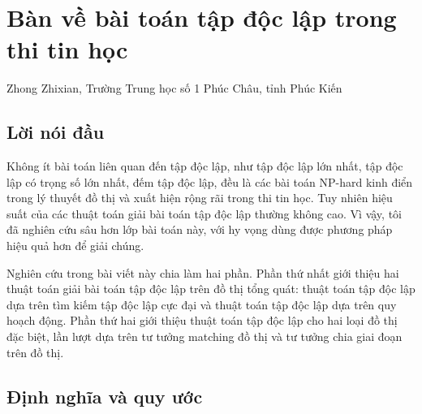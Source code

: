\documentclass[11pt]{article}
\begin{document}
\section{Bàn về bài toán tập độc lập trong thi tin học}

\begin{center}
Zhong Zhixian, Trường Trung học số 1 Phúc Châu, tỉnh Phúc Kiến
\end{center}

\renewcommand{\abstractname}{Tóm tắt}
\begin{abstract}
Tìm thuật toán tốt hơn cho các bài toán NP-hard là một nội dung quan trọng của
tin học. Trong đó, các bài toán liên quan đến tập độc lập khá thường gặp và
cũng nhiều lần xuất hiện trong thi tin học. Bài viết này bắt đầu từ các tính
chất của tập độc lập, rồi giới thiệu vài lớp thuật toán tập độc lập dựa trên
nhiều tư tưởng khác nhau. Với đồ thị tổng quát, trên cơ sở thuật toán tìm kiếm,
bài viết đề xuất thuật toán tối ưu bằng quy hoạch động, đồng thời phân tích và
kiểm thử hiệu suất của vài thuật toán trên dữ liệu ngẫu nhiên. Với đồ thị đặc
biệt, bài viết giới thiệu hai tư tưởng thuật toán cho đồ thị đặc biệt, đề xuất
tư tưởng giải bài toán tập độc lập trên ``đồ thị \(k\)-xương rồng'' và các ứng
dụng mở rộng của nó.
\end{abstract}

\subsection{Lời nói đầu}

Không ít bài toán liên quan đến tập độc lập, như tập độc lập lớn nhất, tập độc
lập có trọng số lớn nhất, đếm tập độc lập, đều là các bài toán NP-hard kinh
điển trong lý thuyết đồ thị và xuất hiện rộng rãi trong thi tin học. Tuy nhiên
hiệu suất của các thuật toán giải bài toán tập độc lập thường không cao. Vì
vậy, tôi đã nghiên cứu sâu hơn lớp bài toán này, với hy vọng dùng được phương
pháp hiệu quả hơn để giải chúng.

Nghiên cứu trong bài viết này chia làm hai phần. Phần thứ nhất giới thiệu hai
thuật toán giải bài toán tập độc lập trên đồ thị tổng quát: thuật toán tập độc
lập dựa trên tìm kiếm tập độc lập cực đại và thuật toán tập độc lập dựa trên
quy hoạch động. Phần thứ hai giới thiệu thuật toán tập độc lập cho hai loại đồ
thị đặc biệt, lần lượt dựa trên tư tưởng matching đồ thị và tư tưởng chia giai
đoạn trên đồ thị.

\subsection{Định nghĩa và quy ước}
\end{document}
